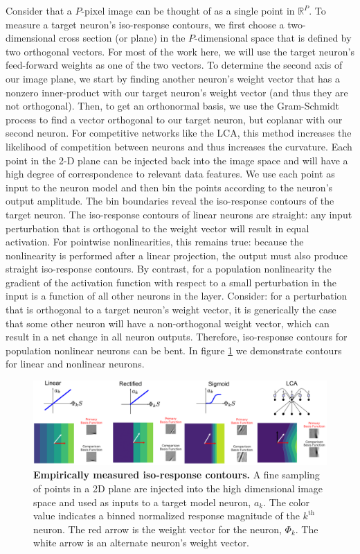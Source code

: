Consider that a $P$-pixel image can be thought of as a single point in $\mathbb{R}^{P}$.
To measure a target neuron's iso-response contours, we first choose a two-dimensional cross section (or plane) in the $P$-dimensional space that is defined by two orthogonal vectors.
For most of the work here, we will use the target neuron's feed-forward weights as one of the two vectors.
To determine the second axis of our image plane, we start by finding another neuron's weight vector that has a nonzero inner-product with our target neuron's weight vector (and thus they are not orthogonal).
Then, to get an orthonormal basis, we use the Gram-Schmidt process to find a vector orthogonal to our target neuron, but coplanar with our second neuron.
For competitive networks like the LCA, this method increases the likelihood of competition between neurons and thus increases the curvature. 
Each point in the 2-D plane can be injected back into the image space and will have a high degree of correspondence to relevant data features.
We use each point as input to the neuron model and then bin the points according to the neuron's output amplitude.
The bin boundaries reveal the iso-response contours of the target neuron.
The iso-response contours of linear neurons are straight: any input perturbation that is orthogonal to the weight vector will result in equal activation.
For pointwise nonlinearities, this remains true: because the nonlinearity is performed after a linear projection, the output must also produce straight iso-response contours.
By contrast, for a population nonlinearity the gradient of the activation function with respect to a small perturbation in the input is a function of all other neurons in the layer.
Consider: for a perturbation that is orthogonal to a target neuron's weight vector, it is generically the case that some other neuron will have a non-orthogonal weight vector, which can result in a net change in all neuron outputs.
Therefore, iso-response contours for population nonlinear neurons can be bent.
In figure \ref{fig:ch4_iso_contours} we demonstrate contours for linear and nonlinear neurons.

\begin{figure}[h]
    \centering
    \includegraphics[width=\textwidth]{figures/iso_contour_comparison.png}
    \caption{\textbf{Empirically measured iso-response contours.} A fine sampling of points in a 2D plane are injected into the high dimensional image space and used as inputs to a target model neuron, $a_{k}$. The color value indicates a binned normalized response magnitude of the $k^{\text{th}}$ neuron. The red arrow is the weight vector for the neuron, $\Phi_{k}$. The white arrow is an alternate neuron's weight vector.}
    \label{fig:ch4_iso_contours}
\end{figure}

